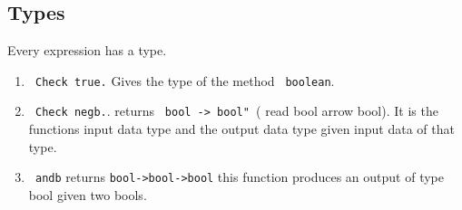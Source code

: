     \subsection{Types}
     Every expression has a type.
     \begin{enumerate}
     \item  \lstinline! Check true.! Gives the type of the method \lstinline! boolean!.
     \item \lstinline! Check negb.!. returns \lstinline! bool -> bool" !( read \glqq bool arrow bool\grqq).
      It is the functions input data type and the output data type given input data of that type.
      \item \lstinline! andb! returns \lstinline!bool->bool->bool! this function produces an output of type bool given two bools.
     \end{enumerate}
     
     
     